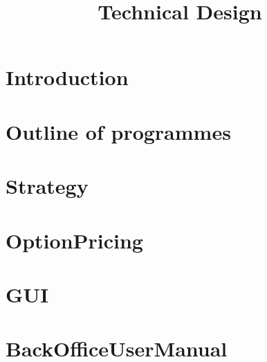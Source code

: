 \documentclass[12pt,a4paper,titlepage]{article}
\title {Technical Design}
\begin{document}
\maketitle
\listoftables
\tableofcontents
\section{Introduction}


\section{Outline of programmes}

\section{\FeedName}

\section{\AnalyisName}

\section{Strategy}
\section{OptionPricing}
\section{GUI}
\section{BackOfficeUserManual}
\label{itm:UserManual}
%
\end{document}

